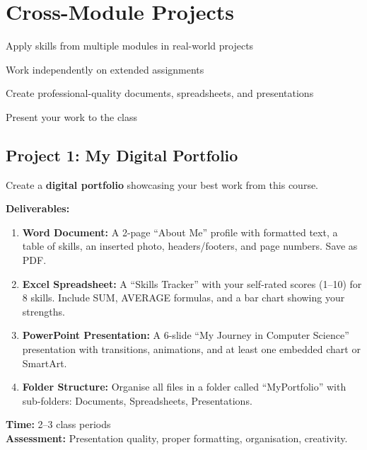\chapter{Cross-Module Projects}
\label{ch:projects}

\begin{objectives}
  \item Apply skills from multiple modules in real-world projects
  \item Work independently on extended assignments
  \item Create professional-quality documents, spreadsheets, and presentations
  \item Present your work to the class
\end{objectives}


\section{Project 1: My Digital Portfolio}
\label{sec:proj1}

\begin{labstep}
Create a \textbf{digital portfolio} showcasing your best work from this course.

\textbf{Deliverables:}
\begin{enumerate}[label=\textcolor{ModuleBlue}{\textbf{\arabic*.}}, itemsep=3pt]
  \item \textbf{Word Document:} A 2-page ``About Me'' profile with formatted text, a table of skills, an inserted photo, headers/footers, and page numbers. Save as PDF.
  \item \textbf{Excel Spreadsheet:} A ``Skills Tracker'' with your self-rated scores (1--10) for 8 skills. Include SUM, AVERAGE formulas, and a bar chart showing your strengths.
  \item \textbf{PowerPoint Presentation:} A 6-slide ``My Journey in Computer Science'' presentation with transitions, animations, and at least one embedded chart or SmartArt.
  \item \textbf{Folder Structure:} Organise all files in a folder called ``MyPortfolio'' with sub-folders: Documents, Spreadsheets, Presentations.
\end{enumerate}

\textbf{Time:} 2--3 class periods\\
\textbf{Assessment:} Presentation quality, proper formatting, organisation, creativity.
\end{labstep}

